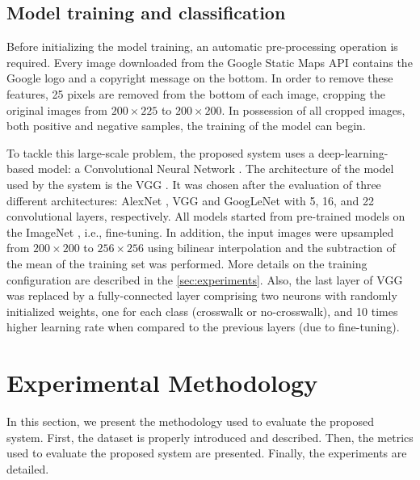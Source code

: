 \documentclass[journal]{IEEEtran}
\newcommand{\GoogleStaticMapsAPI}{Google Static Maps API\xspace}
\begin{document}
\subsection{Model training and classification}

Before initializing the model training, an automatic pre-processing operation is required. Every image downloaded from the \GoogleStaticMapsAPI contains the Google logo and a copyright message on the bottom. In order to remove these features, 25 pixels are removed from the bottom of each image, cropping the original images from $200\times225$ to $200\times200$. In possession of all cropped images, both positive and negative samples, the training of the model can begin.

To tackle this large-scale problem, the proposed system uses a deep-learning-based model: a Convolutional Neural Network \cite{le1990handwritten}. 
The architecture of the model used by the system is the VGG \cite{simonyan2014very}. It was chosen after the evaluation of three different architectures: AlexNet \cite{krizhevsky2012imagenet}, VGG and GoogLeNet \cite{szegedy2015going} with 5, 16, and 22 convolutional layers, respectively. All models started from pre-trained models on the ImageNet \cite{ILSVRC15}, i.e., fine-tuning. In addition, the input images were upsampled from $200\times200$ to $256\times256$ using bilinear interpolation and the subtraction of the mean of the training set was performed. More details on the training configuration are described in the \autoref{sec:experiments}. Also, the last layer of VGG was replaced by a fully-connected layer comprising two neurons with randomly initialized weights, one for each class (crosswalk or no-crosswalk), and 10 times higher learning rate when compared to the previous layers (due to fine-tuning).

\section{Experimental Methodology}
\label{sec:experiments}

In this section, we present the methodology used to evaluate the proposed system. First, the dataset is properly introduced and described. Then, the metrics used to evaluate the proposed system are presented. Finally, the experiments are detailed.
\end{document}
